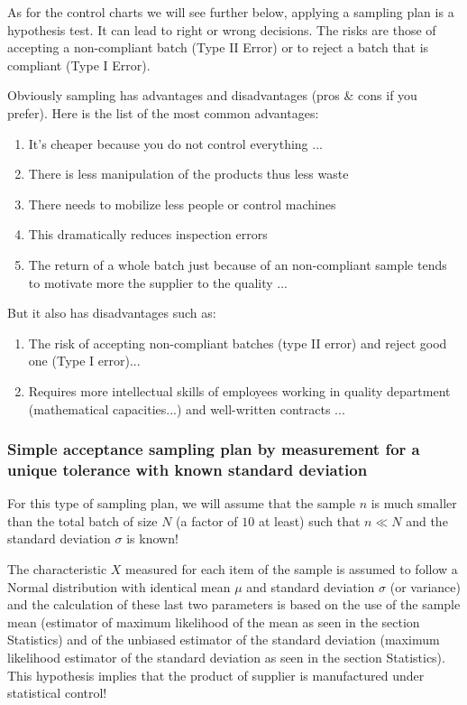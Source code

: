 	\begin{tcolorbox}[title=Remark,colframe=black,arc=10pt]
	As for the control charts we will see further below, applying a sampling plan is a hypothesis test. It can lead to right or wrong decisions. The risks are those of accepting a non-compliant batch (Type II Error) or to reject a batch that is compliant (Type I Error).
	\end{tcolorbox}
	Obviously sampling has advantages and disadvantages (pros \& cons if you prefer). Here is the list of the most common advantages:
	\begin{enumerate}
		\item It's cheaper because you do not control everything ...

		\item There is less manipulation of the products thus less waste

		\item There needs to mobilize less people or control machines

		\item This dramatically reduces inspection errors

		\item The return of a whole batch just because of an non-compliant sample tends to motivate more the supplier to the quality ...
	\end{enumerate}
	But it also has disadvantages such as:
	\begin{enumerate}
		\item The risk of accepting non-compliant batches (type II error) and reject good one (Type I error)...

		\item Requires more intellectual skills of employees working in quality department (mathematical capacities...) and well-written contracts ...
	\end{enumerate}
	
	\subsubsection{Simple acceptance sampling plan by measurement for a unique tolerance with known standard deviation}
	For this type of sampling plan, we will assume that the sample $n$ is much smaller than the total batch of size $N$ (a factor of $10$ at least) such that $n\ll N$ and the standard deviation $\sigma$ is known!
	
	The characteristic $X$ measured for each item of the sample is assumed to follow a Normal distribution with  identical mean $\mu$ and standard deviation $\sigma$ (or variance) and the calculation of these last two parameters is based on the use of the sample mean (estimator of maximum likelihood of the mean as seen in the section Statistics) and of the unbiased estimator of the standard deviation (maximum likelihood estimator of the standard deviation as seen in the section Statistics). This hypothesis implies that the product of supplier is manufactured under statistical control!
	
